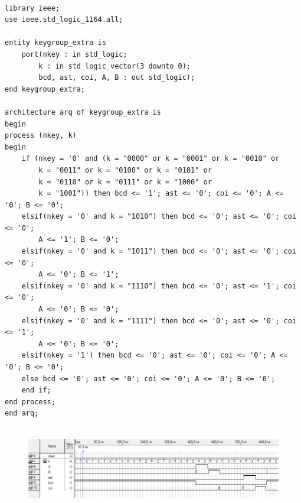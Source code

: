\documentclass[12pt, a4papre]{article}
\begin{document}
	\begin{lstlisting}[style=vhdl, frame=single, basicstyle=\tiny]

library ieee;
use ieee.std_logic_1164.all;

entity keygroup_extra is
	port(nkey : in std_logic;
		k : in std_logic_vector(3 downto 0);
		bcd, ast, coi, A, B : out std_logic);
end keygroup_extra;

architecture arq of keygroup_extra is
begin
process (nkey, k)
begin
	if (nkey = '0' and (k = "0000" or k = "0001" or k = "0010" or
		k = "0011" or k = "0100" or k = "0101" or
		k = "0110" or k = "0111" or k = "1000" or
		k = "1001")) then bcd <= '1'; ast <= '0'; coi <= '0'; A <= '0'; B <= '0';
	elsif(nkey = '0' and k = "1010") then bcd <= '0'; ast <= '0'; coi <= '0'; 
		A <= '1'; B <= '0';
	elsif(nkey = '0' and k = "1011") then bcd <= '0'; ast <= '0'; coi <= '0'; 	
		A <= '0'; B <= '1';
	elsif(nkey = '0' and k = "1110") then bcd <= '0'; ast <= '1'; coi <= '0'; 
		A <= '0'; B <= '0';
	elsif(nkey = '0' and k = "1111") then bcd <= '0'; ast <= '0'; coi <= '1'; 
		A <= '0'; B <= '0';
	elsif(nkey = '1') then bcd <= '0'; ast <= '0'; coi <= '0'; A <= '0'; B <= '0';
	else bcd <= '0'; ast <= '0'; coi <= '0'; A <= '0'; B <= '0';
	end if;
end process;
end arq;


			\end{lstlisting}
			
			
						\begin{figure}[H]
		\begin{center}
		\includegraphics[width=130mm]{simulacioKeyGroupExtra.jpeg}
		\end{center}
	\end{figure}	
	
\end{document}
